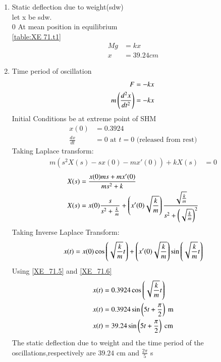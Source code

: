 \documentclass[journal,12pt,twocolumn]{IEEEtran}
\theoremstyle{remark}
\begin{document}
\begin{enumerate}
    \item Static deflection due to weight(sdw)\\
    let x be sdw.\\0
    At mean position in equilibrium\\
    \ref{table:XE 71.t1}
    \begin{align}
        Mg&=kx\\
        x&=39.24cm
    \end{align}
     \item Time period of oscillation\\
     \begin{align}
           F&=-kx\\
           m\left(\frac{d^2x}{dt^2}\right)&=-kx
     \end{align}
      Initial Conditions be at extreme  point of SHM
      \begin{align}
       x(0)&=0.3924 \label{XE_71.5}\\
       \frac{dx}{dt}&=0 \text{ at } t=0 \text{ (released from rest)} \label{XE_71.6}
        \end{align} 
     Taking Laplace transform:
     \begin{align}
     m(s^2X(s)-sx(0)-mx'(0))+kX(s)&=0
     \end{align}
     \begin{align}
      X(s) &= \frac{x(0)ms+mx'(0)}{ms^2 + k}\\
      X(s)&=x(0)\frac{s}{s^2+\frac{k}{m}}+\left(x'(0)\sqrt{\frac{k}{m}}\right)\frac{\sqrt{\frac{k}{m}}}{s^2+\left(\sqrt{\frac{k}{m}}\right)^2}
      \end{align}
     Taking Inverse Laplace Transform:\\
     \begin{align}
     x(t)&=x(0)\cos\left(\sqrt{\frac{k}{m}}t\right)+\left(x'(0)\sqrt{\frac{k}{m}}\right)\sin \left(\sqrt{\frac{k}{m}}t\right)\\
     \end{align}
     Using \ref{XE_71.5} and \ref{XE_71.6} 
     \begin{align}
      x(t) &= 0.3924 \cos\left(\sqrt{\frac{k}{m}}t\right)\\
      x(t)&=0.3924\sin\left(5t+\frac{\pi}{2}\right)\text{ m}\\
      x(t)&=39.24 \sin\left(5t+\frac{\pi}{2}\right) \text{ cm}
     \end{align}
    The static deflection due to weight and the time period of the oscillations,respectively are $39.24$ cm and $\frac{2\pi}{5}$ s
\end{enumerate}
\end{document}
